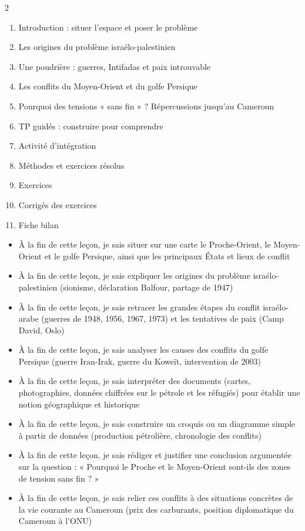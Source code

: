 \documentclass[11pt]{article}
\begin{document}
\begin{sommaire}
\begin{multicols}{2}
\begin{enumerate}
\item Introduction : situer l'espace et poser le problème
\item Les origines du problème israélo-palestinien
\item Une poudrière : guerres, Intifadas et paix introuvable
\item Les conflits du Moyen-Orient et du golfe Persique
\item Pourquoi des tensions « sans fin » ? Répercussions jusqu'au Cameroun
\item TP guidés : construire pour comprendre
\item Activité d'intégration
\item Méthodes et exercices résolus
\item Exercices
\item Corrigés des exercices
\item Fiche bilan
\end{enumerate}
\end{multicols}
\end{sommaire}

\begin{objectifs}
\begin{itemize}
\item À la fin de cette leçon, je sais situer sur une carte le Proche-Orient, le Moyen-Orient et le golfe Persique, ainsi que les principaux États et lieux de conflit
\item À la fin de cette leçon, je sais expliquer les origines du problème israélo-palestinien (sionisme, déclaration Balfour, partage de 1947)
\item À la fin de cette leçon, je sais retracer les grandes étapes du conflit israélo-arabe (guerres de 1948, 1956, 1967, 1973) et les tentatives de paix (Camp David, Oslo)
\item À la fin de cette leçon, je sais analyser les causes des conflits du golfe Persique (guerre Iran-Irak, guerre du Koweït, intervention de 2003)
\item À la fin de cette leçon, je sais interpréter des documents (cartes, photographies, données chiffrées sur le pétrole et les réfugiés) pour établir une notion géographique et historique
\item À la fin de cette leçon, je sais construire un croquis ou un diagramme simple à partir de données (production pétrolière, chronologie des conflits)
\item À la fin de cette leçon, je sais rédiger et justifier une conclusion argumentée sur la question : « Pourquoi le Proche et le Moyen-Orient sont-ils des zones de tension sans fin ? »
\item À la fin de cette leçon, je sais relier ces conflits à des situations concrètes de la vie courante au Cameroun (prix des carburants, position diplomatique du Cameroun à l'ONU)
\end{itemize}
\end{objectifs}
\end{document}
